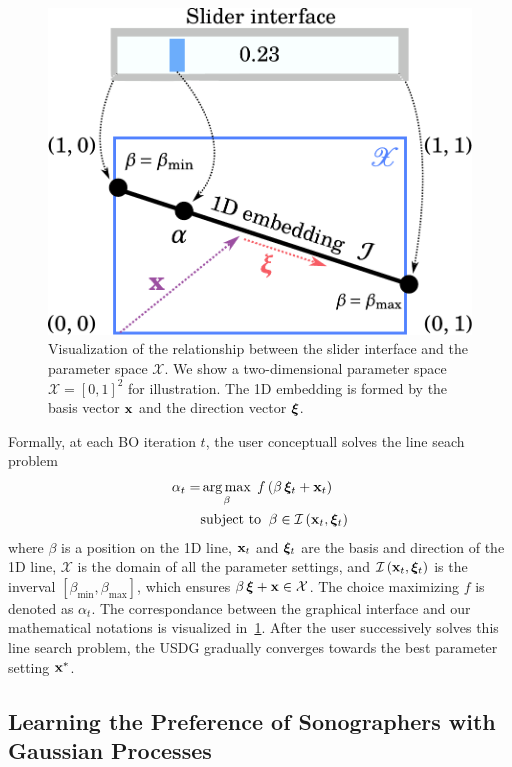 \begin{figure}[h]
  \centering
  \includegraphics[scale=0.35]{figures/linesearch.pdf}
  \caption{Visualization of the relationship between the slider interface and the parameter space \(\mathcal{X}\).
    We show a two-dimensional parameter space \(\mathcal{X} = {[0, 1]}^2\) for illustration.
    The 1D embedding is formed by the basis vector \(\mathbf{x}\) and the direction vector \(\bm{\xi}\).
  }\label{fig:linesearch}
\end{figure}
%
Formally, at each BO iteration \(t\), the user conceptuall solves the line seach problem
\begin{align}
 \alpha_t = &\operatorname*{arg\,max}_{ \beta }\; f\,(\beta\,\bm{\xi}_t + \mathbf{x}_t) \label{eq:line_search}\\
 &\text{subject to}\;\; \beta \in \mathcal{I}\left(\mathbf{x}_t, \bm{\xi}_t\right) 
\end{align}
{\noindent}where \(\beta\) is a position on the 1D line, \(\mathbf{x}_t\) and \(\bm{\xi}_t\) are the basis and direction of the 1D line, \(\mathcal{X}\) is the domain of all the parameter settings, and \(\mathcal{I}\left(\mathbf{x}_t, \bm{\xi}_t\right)\) is the inverval \([\beta_{\mathrm{min}}, \beta_{\mathrm{max}}]\), which ensures \(\beta\,\bm{\xi} + \mathbf{x}  \in \mathcal{X}\).
The choice maximizing \(f\) is denoted as \(\alpha_t\).
The correspondance between the graphical interface and our mathematical notations is visualized in~\cref{fig:linesearch}.
After the user successively solves this line search problem, the USDG gradually converges towards the best parameter setting \(\mathbf{x}^{*}\).

\subsection{Learning the Preference of Sonographers with Gaussian Processes}\label{section:gp}
